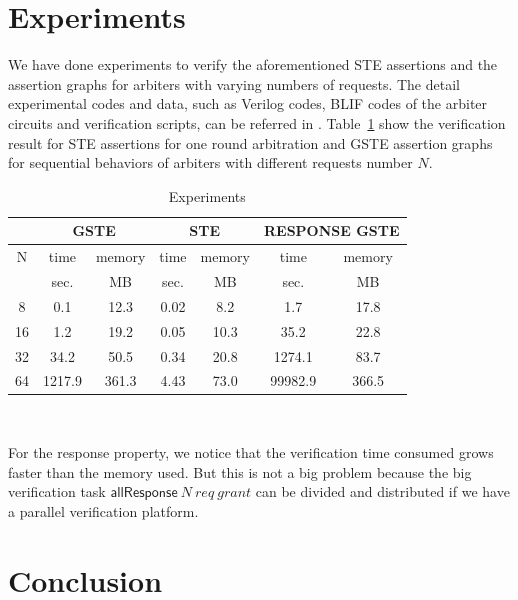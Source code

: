\documentclass[final]{IEEEtran}
\begin{document}
\section{Experiments}\label{sec:experiments}

We have done experiments to verify the aforementioned STE assertions
and the assertion graphs for arbiters with varying numbers of
requests. The detail experimental codes and data, such as Verilog
codes, BLIF codes of the arbiter circuits and verification scripts,
can be referred in \cite{Li11ArbiterExperiments}.
Table~\ref{steGsteExperiments} show the verification result for STE
assertions for one round arbitration and GSTE assertion graphs for
sequential behaviors of arbiters with different requests number $N$.

\begin{table}
\caption{Experiments}
\label{steGsteExperiments}
\begin{tabular}{||c||c|c||c|c||c|c||}
\hline \hline
\multicolumn{1}{||c||}{ } & \multicolumn{2}{|c||}{GSTE} & \multicolumn{2}{|c||}{STE} & \multicolumn{2}{|c||}{RESPONSE GSTE} \\
\hline
N & time & memory & time & memory & time & memory\\
       & sec. & MB & sec. & MB & sec. & MB \\
\hline \hline
8 & 0.1 & 12.3 & 0.02 & 8.2 & 1.7 & 17.8\\
16 & 1.2 & 19.2 & 0.05 & 10.3 &35.2 & 22.8\\
32 & 34.2 & 50.5 & 0.34 & 20.8 &1274.1 & 83.7\\
64 & 1217.9 & 361.3 & 4.43 & 73.0 & 99982.9 & 366.5\\
\hline \hline
\end{tabular}\\
\end{table}
For the response property,  we notice that the verification time consumed grows faster than the memory used. %
But this is not a big problem because the big verification task
$\mathsf{allResponse} \     N\ req\ grant$
can be divided and distributed if we have a parallel verification platform. %

\section{Conclusion}\label{sec:conclusion}
\end{document}

